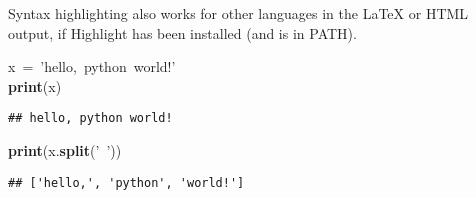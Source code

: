 \documentclass{article}\usepackage[]{graphicx}\usepackage[]{xcolor}
\makeatletter
\newcommand{\hlstr}[1]{\textcolor[rgb]{0.192,0.494,0.8}{#1}}%
\newcommand{\hlopt}[1]{\textcolor[rgb]{0,0,0}{#1}}%
\newcommand{\hlstd}[1]{\textcolor[rgb]{0.345,0.345,0.345}{#1}}%
\newcommand{\hlkwa}[1]{\textcolor[rgb]{0.161,0.373,0.58}{\textbf{#1}}}%
\newcommand{\hlkwd}[1]{\textcolor[rgb]{0.737,0.353,0.396}{\textbf{#1}}}%
\newenvironment{kframe}{%
 \def\at@end@of@kframe{}%
 \ifinner\ifhmode%
  \def\at@end@of@kframe{\end{minipage}}%
  \begin{minipage}{\columnwidth}%
 \fi\fi%
 \def\FrameCommand##1{\hskip\@totalleftmargin \hskip-\fboxsep
 \colorbox{shadecolor}{##1}\hskip-\fboxsep
     \hskip-\linewidth \hskip-\@totalleftmargin \hskip\columnwidth}%
 \MakeFramed {\advance\hsize-\width
   \@totalleftmargin\z@ \linewidth\hsize
   \@setminipage}}%
 {\par\unskip\endMakeFramed%
 \at@end@of@kframe}
\newenvironment{knitrout}{}{} %
\makeatother
\begin{document}
Syntax highlighting also works for other languages in the \LaTeX{} or HTML output, if Highlight has been installed (and is in PATH).

\begin{knitrout}
\color{fgcolor}\begin{kframe}
\noindent
\ttfamily
\hlstd{x\ }\hlopt{=\ }\hlstd{}\hlstr{'hello,\ python\ world!'}\hlstd{}\hspace*{\fill}\\
\hlstd{}\hlkwa{print}\hlstd{}\hlopt{(}\hlstd{x}\hlopt{)}\hlstd{}\hspace*{\fill}
\mbox{}
\normalfont
\begin{verbatim}
## hello, python world!
\end{verbatim}
\noindent
\ttfamily
\hlstd{}\hlkwa{print}\hlstd{}\hlopt{(}\hlstd{x}\hlopt{.}\hlstd{}\hlkwd{split}\hlstd{}\hlopt{(}\hlstd{}\hlstr{'\ '}\hlstd{}\hlopt{))}\hlstd{}\hspace*{\fill}
\mbox{}
\normalfont
\begin{verbatim}
## ['hello,', 'python', 'world!']
\end{verbatim}
\end{kframe}
\end{knitrout}
\end{document}
